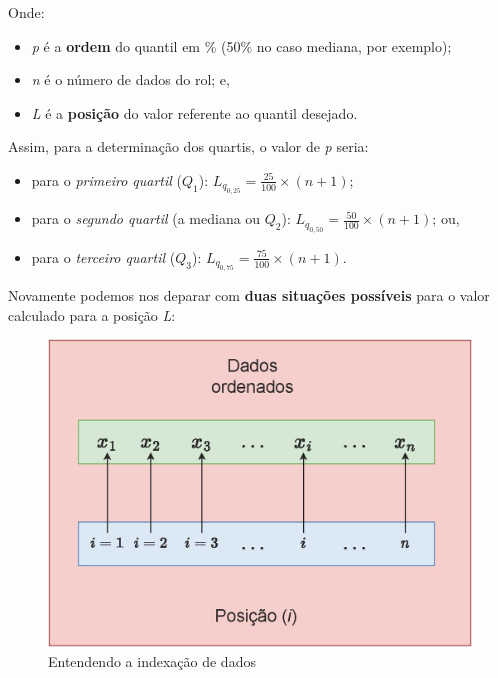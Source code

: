 \documentclass[
]{book}
\providecommand{\tightlist}{%
  \setlength{\itemsep}{0pt}\setlength{\parskip}{0pt}}
\begin{document}
Onde:

\hfill\break

\begin{itemize}
\tightlist
\item
  \emph{p} é a \textbf{ordem} do quantil em \% (50\% no caso mediana, por exemplo);
\item
  \emph{n} é o número de dados do rol; e,
\item
  \emph{L} é a \textbf{posição} do valor referente ao quantil desejado.
\end{itemize}

\hfill\break

\hfill\break

Assim, para a determinação dos quartis, o valor de \emph{p} seria:

\hfill\break

\begin{itemize}
\tightlist
\item
  para o \emph{primeiro quartil} (\(Q_{1}\)): \(L_{q_{0,25}}=\frac{25}{100} \times (n+1)\);
\item
  para o \emph{segundo quartil} (a mediana ou \(Q_{2}\)): \(L_{q_{0,50}}=\frac{50}{100} \times (n+1)\); ou,\\
\item
  para o \emph{terceiro quartil} (\(Q_{3}\)): \(L_{q_{0,75}}=\frac{75}{100} \times (n+1)\).
\end{itemize}

\hfill\break

Novamente podemos nos deparar com \textbf{duas situações possíveis} para o valor calculado para a posição \emph{L}:

\hfill\break

\begin{figure}

{\centering \includegraphics[width=0.6\linewidth]{images3/vetor_posicao} 

}

\caption{Entendendo a indexação de dados}\label{fig:unnamed-chunk-35}
\end{figure}
\end{document}
